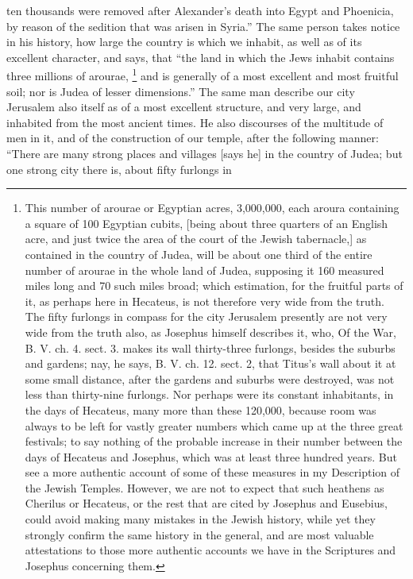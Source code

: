 ten thousands were removed after Alexander's death into Egypt and
Phoenicia, by reason of the sedition that was arisen in Syria.'' The same
person takes notice in his history, how large the country is which we
inhabit, as well as of its excellent character, and says, that ``the land
in which the Jews inhabit contains three millions of arourae, \footnote{This number of arourae or
Egyptian acres, 3,000,000, each aroura containing a square of 100 Egyptian
cubits, [being about three quarters of an English acre, and just twice the
area of the court of the Jewish tabernacle,] as contained in the country
of Judea, will be about one third of the entire number of arourae in the
whole land of Judea, supposing it 160 measured miles long and 70 such
miles broad; which estimation, for the fruitful parts of it, as perhaps
here in Hecateus, is not therefore very wide from the truth. The fifty
furlongs in compass for the city Jerusalem presently are not very wide
from the truth also, as Josephus himself describes it, who, Of the War, B.
V. ch. 4. sect. 3. makes its wall thirty-three furlongs, besides the
suburbs and gardens; nay, he says, B. V. ch. 12. sect. 2, that Titus's
wall about it at some small distance, after the gardens and suburbs were
destroyed, was not less than thirty-nine furlongs. Nor perhaps were its
constant inhabitants, in the days of Hecateus, many more than these
120,000, because room was always to be left for vastly greater numbers
which came up at the three great festivals; to say nothing of the probable
increase in their number between the days of Hecateus and Josephus, which
was at least three hundred years. But see a more authentic account of some
of these measures in my Description of the Jewish Temples. However, we are
not to expect that such heathens as Cherilus or Hecateus, or the rest that
are cited by Josephus and Eusebius, could avoid making many mistakes in
the Jewish history, while yet they strongly confirm the same history in
the general, and are most valuable attestations to those more authentic
accounts we have in the Scriptures and Josephus concerning them.}
and is generally of a most excellent and most fruitful soil; nor is Judea
of lesser dimensions.'' The same man describe our city Jerusalem also
itself as of a most excellent structure, and very large, and inhabited
from the most ancient times. He also discourses of the multitude of men in
it, and of the construction of our temple, after the following manner:
``There are many strong places and villages [says he] in the country of
Judea; but one strong city there is, about fifty furlongs in
